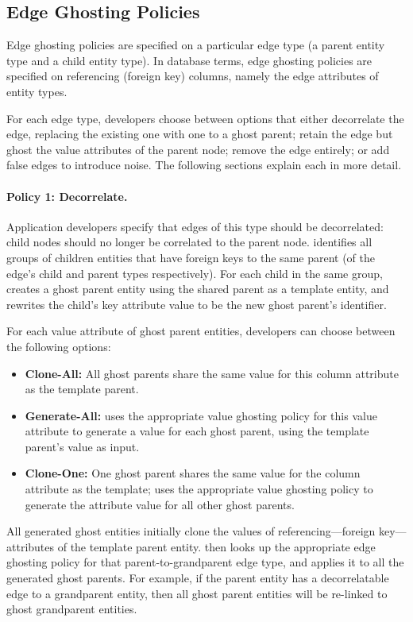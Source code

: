 \subsection{Edge Ghosting Policies}
Edge ghosting policies are specified on a particular edge type (a parent entity type and a child
entity type). In database terms, edge ghosting policies are specified on referencing
(foreign key) columns, namely the edge attributes of entity types.

For each edge type, developers choose between options that either decorrelate the edge, replacing
the existing one with one to a ghost parent; retain the edge but ghost the value attributes of the
parent node; remove the edge entirely; or add false edges to introduce noise.  The following
sections explain each in more detail.

\paragraph{Policy 1: Decorrelate.}
Application developers specify that edges of this type should be decorrelated: child nodes should no
longer be correlated to the parent node. \sys identifies all groups of children entities that have
foreign keys to the same parent (of the edge's child and parent types respectively). For each child
in the same group, \sys creates a ghost parent entity using the shared parent as a template entity,
and rewrites the child's key attribute value to be the new ghost parent's identifier. 

For each value attribute of ghost parent entities, developers can choose between the
following options:
\begin{itemize}
    \item \textbf{Clone-All:} All ghost parents share the same value for this column attribute as the
        template parent.
    \item \textbf{Generate-All:} \sys uses the appropriate value ghosting policy for this
        value attribute to generate a value for each ghost parent, using the template parent's value
        as input.
    \item \textbf{Clone-One:} One ghost parent shares the same value for the column attribute as the
        template; \sys uses the appropriate value ghosting policy to generate the attribute value
        for all other ghost parents.
\end{itemize}

All generated ghost entities initially clone the values of referencing---foreign key---attributes of
the template parent entity.  \sys then looks up the appropriate edge ghosting policy for that
parent-to-grandparent edge type, and applies it to all the generated ghost parents. For example, if
the parent entity has a decorrelatable edge to a grandparent entity, then all ghost parent entities
will be re-linked to ghost grandparent entities.

